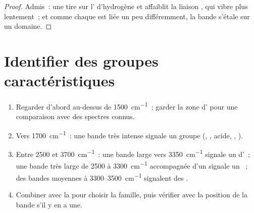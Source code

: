 \begin{proof}
Admis~: une  tire sur l' d'hydrogène et affaiblit
la liaison , qui vibre plus lentement~; et comme chaque 
est liée un peu différemment, la bande s'étale sur un domaine.
\end{proof}

\section{Identifier des groupes caractéristiques}


\begin{method}\label{met:g11:infrared:reading}
\begin{enumerate}
  \item Regarder d'abord au-dessus de \qty{1500}{cm^{-1}}~; garder la zone
        d' pour une comparaison avec des spectres
        connus.
  \item Vers \qty{1700}{cm^{-1}}~: une bande très intense signale un
        groupe  (, , acide, , ).
  \item Entre 2500 et \qty{3700}{cm^{-1}}~: une bande large vers
        \qty{3350}{cm^{-1}} signale un  d'~; une bande très
        large de 2500 à \qty{3300}{cm^{-1}} accompagnée d'un 
        signale un ~; des bandes moyennes à
        3300--\qty{3500}{cm^{-1}} signalent des .
  \item Combiner avec la  pour choisir la famille, puis
        vérifier avec la position de la bande  s'il y en a une.
\end{enumerate}
\end{method}

